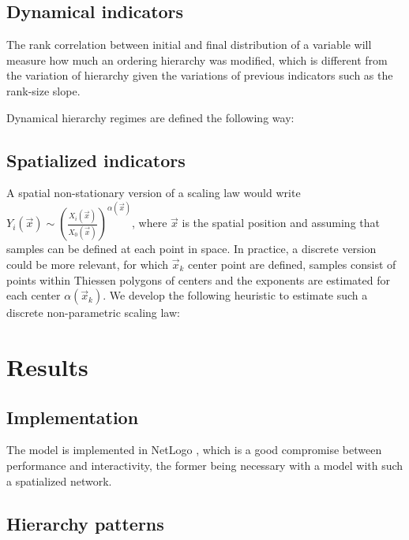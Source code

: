 \documentclass[english,fleqn,allpages]{ISTE_science}[2018/07/30]
\begin{document}
\subsection{Dynamical indicators}

The rank correlation between initial and final distribution of a variable will measure how much an ordering hierarchy was modified, which is different from the variation of hierarchy given the variations of previous indicators such as the rank-size slope.

Dynamical hierarchy regimes are defined the following way: 


\subsection{Spatialized indicators}

A spatial non-stationary version of a scaling law would write $Y_i (\vec{x}) \sim \left(\frac{X_i(\vec{x})}{X_0 (\vec{x})}\right)^{\alpha (\vec{x})}$, where $\vec{x}$ is the spatial position and assuming that samples can be defined at each point in space. In practice, a discrete version could be more relevant, for which $\vec{x}_k$ center point are defined, samples consist of points within Thiessen polygons of centers and the exponents are estimated for each center $\alpha (\vec{x}_k)$. We develop the following heuristic to estimate such a discrete non-parametric scaling law: 




\section{Results}


\subsection{Implementation}

The model is implemented in NetLogo \cite{tisue2004netlogo}, which is a good compromise between performance and interactivity, the former being necessary with a model with such a spatialized network. 


\subsection{Hierarchy patterns}

\end{document}
